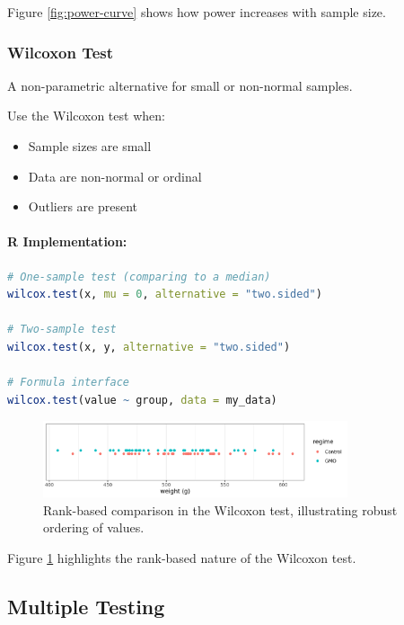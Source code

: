 \documentclass[11pt,a4paper]{article}
\begin{document}
Figure \ref{fig:power-curve} shows how power increases with sample size.

\subsubsection{Wilcoxon Test}

A non-parametric alternative for small or non-normal samples.
\begin{notebox}
Use the Wilcoxon test when:
\begin{itemize}
  \item Sample sizes are small
  \item Data are non-normal or ordinal
  \item Outliers are present
\end{itemize}
\end{notebox}

\paragraph{R Implementation:}
\begin{lstlisting}[language=R]
# One-sample test (comparing to a median)
wilcox.test(x, mu = 0, alternative = "two.sided")

# Two-sample test
wilcox.test(x, y, alternative = "two.sided")

# Formula interface
wilcox.test(value ~ group, data = my_data)
\end{lstlisting}

\begin{figure}[htb]
    \centering
    \includegraphics[width=0.8\textwidth]{wilcoxon-ranked.png}
    \caption{Rank-based comparison in the Wilcoxon test, illustrating robust ordering of values.}
    \label{fig:rank-comparison}
\end{figure}

Figure \ref{fig:rank-comparison} highlights the rank-based nature of the Wilcoxon test.

\subsection{Multiple Testing}
\end{document}
